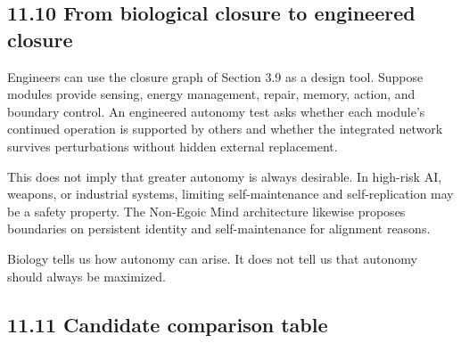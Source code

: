 \documentclass[
  11pt,
]{article}
\begin{document}
\subsection{11.10 From biological closure to engineered
closure}\label{from-biological-closure-to-engineered-closure}

Engineers can use the closure graph of Section 3.9 as a design tool.
Suppose modules provide sensing, energy management, repair, memory,
action, and boundary control. An engineered autonomy test asks whether
each module's continued operation is supported by others and whether the
integrated network survives perturbations without hidden external
replacement.

This does not imply that greater autonomy is always desirable. In
high-risk AI, weapons, or industrial systems, limiting self-maintenance
and self-replication may be a safety property. The Non-Egoic Mind
architecture likewise proposes boundaries on persistent identity and
self-maintenance for alignment reasons.

Biology tells us how autonomy can arise. It does not tell us that
autonomy should always be maximized.

\subsection{11.11 Candidate comparison
table}\label{candidate-comparison-table}
\end{document}
